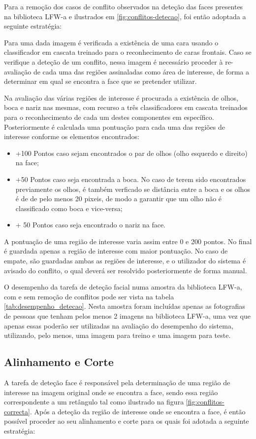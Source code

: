 Para a remoção dos casos de conflito observados na deteção das faces presentes na biblioteca LFW-a e ilustrados em \ref{fig:conflitos-detecao}, foi então adoptada a seguinte estratégia:

Para uma dada imagem é verificada a existência de uma cara usando o classificador em cascata treinado para o reconhecimento de caras frontais. Caso se verifique a deteção de um conflito, nessa imagem é necessário proceder à re-avaliação de cada uma das regiões assinaladas como área de interesse, de forma a determinar em qual se encontra a face que se pretender utilizar.

Na avaliação das várias regiões de interesse é procurada a existência de olhos, boca e nariz nas mesmas, com recurso a três classificadores em cascata treinados para o reconhecimento de cada um destes componentes em específico. Posteriormente é calculada uma pontuação para cada uma das regiões de interesse conforme os elementos encontrados:
\begin{itemize}
\item +100 Pontos caso sejam encontrados o par de olhos (olho esquerdo e direito) na face;
\item +50 Pontos caso seja encontrada a boca. No caso de terem sido encontrados previamente os olhos, é também verficado se distância entre a boca e os olhos é de de pelo menos 20 pixeis, de modo a garantir que um olho não é classificado como boca e vice-versa;
\item + 50 Pontos caso seja encontrado o nariz na face.
\end{itemize}
A pontuação de uma região de interesse varia assim entre 0 e 200 pontos. No final é guardada apenas a região de interesse com maior pontuação. No caso de empate, são guardadas ambas as regiões de interesse, e o utilizador do sistema é avisado do conflito, o qual deverá ser resolvido posteriormente de forma manual.

O desempenho da tarefa de deteção facial numa amostra da biblioteca LFW-a, com e sem remoção de conflitos pode ser vista na tabela \ref{tab:desempenho_detecao}. Nesta amostra foram incluídas apenas as fotografias de pessoas que tenham pelos menos 2 imagens na biblioteca LFW-a, uma vez que apenas essas poderão ser utilizadas na avaliação do desempenho do sistema, utilizando, pelo menos, uma imagem para treino e uma imagem para teste.

\subsection{Alinhamento e Corte} \label{sec:alinhamentoEcorte}
A tarefa de deteção face é responsável pela determinação de uma região de interesse na imagem original onde se encontra a face, sendo essa região correspondente a um retângulo tal como ilustrado na figura \ref{fig:conflitos-correcta}. Após a deteção da região de interesse onde se encontra a face, é então possível proceder ao seu alinhamento e corte para os quais foi adotada a seguinte estratégia:

